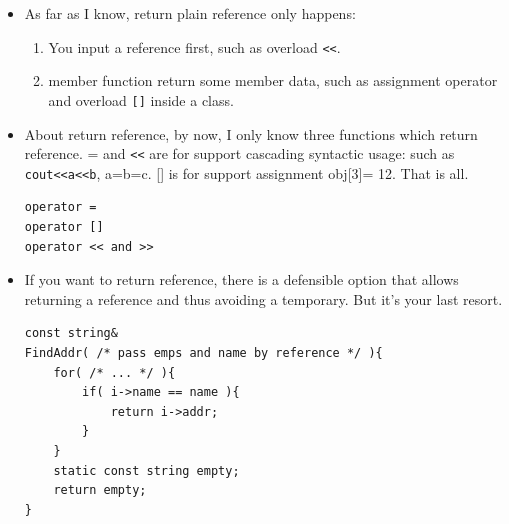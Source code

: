 \documentclass[a4paper,11pt,twoside]{book}
\begin{document}
\begin{itemize}
\begin{enumerate}
	\end{enumerate}
	
	\item As far as I know, return plain reference only happens:
	\begin{enumerate}
		\item You input a reference first, such as overload \verb=<<=.
		\item member function return some member data, such as  assignment operator and overload \verb=[]= inside a class.
	\end{enumerate}
	
	\item About return reference, by now, I only know three functions which return reference. = and \verb=<<= are for support cascading syntactic usage: such as \texttt{cout<<a<<b}, a=b=c.  [] is for support assignment obj[3]= 12.  That is all.
\begin{lstlisting}[numbers=none]
operator =
operator []
operator << and >>
\end{lstlisting}
	
	\item If you want to return reference,  there is a defensible option that allows returning a reference and thus avoiding a temporary. But it's your last resort.
\begin{lstlisting}[numbers=none]
const string&
FindAddr( /* pass emps and name by reference */ ){
	for( /* ... */ ){
		if( i->name == name ){
			return i->addr;
		}
	}
	static const string empty;
	return empty;
}
\end{lstlisting}
	
	
\end{itemize}
\end{document}
